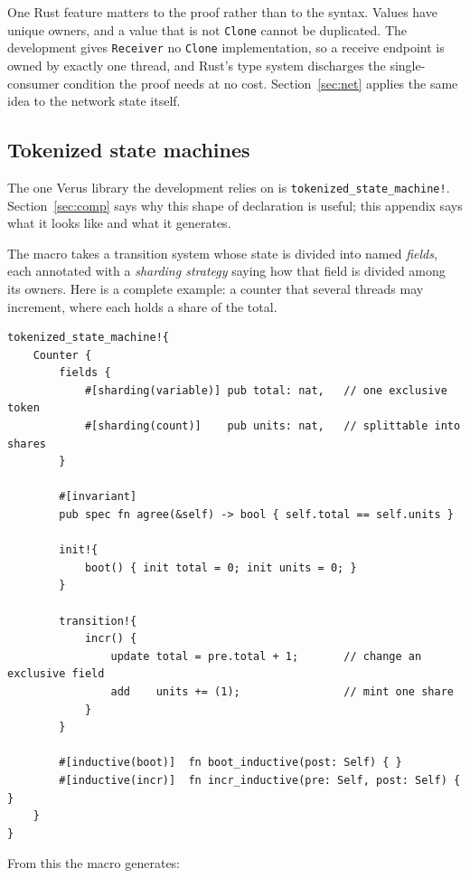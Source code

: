\documentclass[11pt]{article}
\newcommand{\code}[1]{\texttt{#1}}
\newcommand{\srcname}[1]{%
  \vspace{0.9em}\noindent{\sffamily\scriptsize\color{comment}\MakeUppercase{#1}}\par
  \vspace{-0.7em}}
\begin{document}
One Rust feature matters to the proof rather than to the syntax. Values have
unique owners, and a value that is not \code{Clone} cannot be duplicated. The
development gives \code{Receiver} no \code{Clone} implementation, so a receive
endpoint is owned by exactly one thread, and Rust's type system discharges the
single-consumer condition the proof needs at no cost. Section~\ref{sec:net}
applies the same idea to the network state itself.

\subsection*{Tokenized state machines}

The one Verus library the development relies on is
\code{tokenized\_state\_machine!}. Section~\ref{sec:comp} says why this shape of
declaration is useful; this appendix says what it looks like and what it
generates.

The macro takes a transition system whose state is divided into named
\emph{fields}, each annotated with a \emph{sharding strategy} saying how that
field is divided among its owners. Here is a complete example: a counter that
several threads may increment, where each holds a share of the total.

\srcname{a small tokenized state machine}
\begin{lstlisting}
tokenized_state_machine!{
    Counter {
        fields {
            #[sharding(variable)] pub total: nat,   // one exclusive token
            #[sharding(count)]    pub units: nat,   // splittable into shares
        }

        #[invariant]
        pub spec fn agree(&self) -> bool { self.total == self.units }

        init!{
            boot() { init total = 0; init units = 0; }
        }

        transition!{
            incr() {
                update total = pre.total + 1;       // change an exclusive field
                add    units += (1);                // mint one share
            }
        }

        #[inductive(boot)]  fn boot_inductive(post: Self) { }
        #[inductive(incr)]  fn incr_inductive(pre: Self, post: Self) { }
    }
}
\end{lstlisting}

From this the macro generates:
\end{document}
